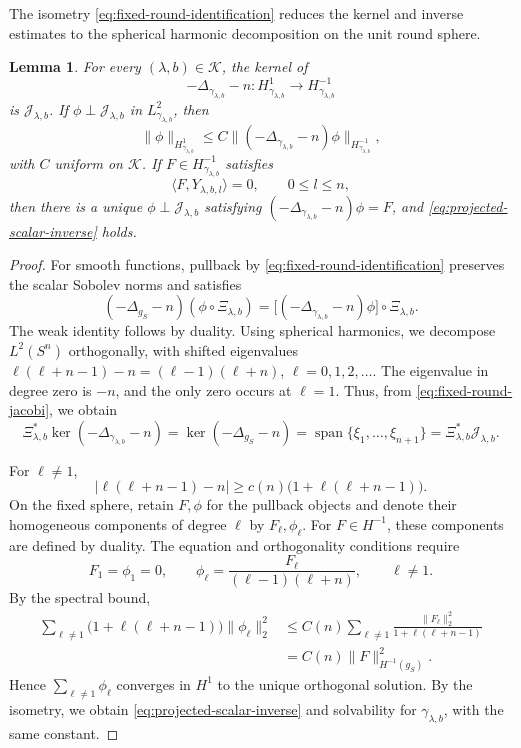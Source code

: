 \documentclass[11pt]{article}
\numberwithin{equation}{section}
\newtheorem{lemma}[theorem]{Lemma}
\theoremstyle{remark}
\newcommand{\Sph}{S}
\newcommand{\norm}[1]{\lVert #1\rVert}
\begin{document}
The isometry \eqref{eq:fixed-round-identification} reduces the kernel
and inverse estimates to the spherical harmonic decomposition on the
unit round sphere.

\begin{lemma}\label{lem:euclidean-scalar-fredholm}
For every \((\lambda,b)\in\mathcal K\), the kernel of
\[
 -\Delta_{\gamma_{\lambda,b}}-n:
 H^1_{\gamma_{\lambda,b}}\to
 H^{-1}_{\gamma_{\lambda,b}}
\]
is \(\mathcal J_{\lambda,b}\).  If
\(\phi\perp\mathcal J_{\lambda,b}\) in \(L^2_{\gamma_{\lambda,b}}\), then
\begin{equation}\label{eq:projected-scalar-inverse}
 \norm{\phi}_{H^1_{\gamma_{\lambda,b}}}
 \le C\norm{(-\Delta_{\gamma_{\lambda,b}}-n)\phi}
 _{H^{-1}_{\gamma_{\lambda,b}}},
\end{equation}
with \(C\) uniform on \(\mathcal K\). If
\(F\in H^{-1}_{\gamma_{\lambda,b}}\) satisfies
\[
 \langle F,Y_{\lambda,b,l}\rangle=0,
 \qquad 0\le l\le n,
\]
then there is a unique
\(\phi\perp\mathcal J_{\lambda,b}\) satisfying
\((-\Delta_{\gamma_{\lambda,b}}-n)\phi=F\), and
\eqref{eq:projected-scalar-inverse} holds.
\end{lemma}

\begin{proof}
{For smooth functions, pullback by
\eqref{eq:fixed-round-identification} preserves the scalar Sobolev norms and
satisfies}
\[
 (-\Delta_{g_{S}}-n)(\phi\circ\Xi_{\lambda,b})
 =\bigl[(-\Delta_{\gamma_{\lambda,b}}-n)\phi\bigr]
   \circ\Xi_{\lambda,b}.
\]
The weak identity follows by duality.
Using spherical harmonics, we decompose
\(L^2(\Sph^n)\) orthogonally, with shifted eigenvalues \(\ell(\ell+n-1)-n=(\ell-1)(\ell+n)\), \(\ell=0,1,2,\ldots\).
The eigenvalue in degree zero is \(-n\), and the only zero occurs at
\(\ell=1\). {Thus, from \eqref{eq:fixed-round-jacobi}, we obtain}
 {
\[
 \Xi_{\lambda,b}^*\ker(-\Delta_{\gamma_{\lambda,b}}-n)
 =\ker(-\Delta_{g_{S}}-n)
 =\operatorname{span}\{\xi_1,\ldots,\xi_{n+1}\}
 =\Xi_{\lambda,b}^*\mathcal J_{\lambda,b}.
\]
}

For \(\ell\ne1\),
\[
 |\ell(\ell+n-1)-n|
 \ge c(n)\bigl(1+\ell(\ell+n-1)\bigr).
\]
On the fixed sphere, retain \(F,\phi\) for the pullback objects and
denote their homogeneous components of degree \(\ell\) by
\(F_\ell,\phi_\ell\).
For \(F\in H^{-1}\), these components are defined by duality.
The equation and orthogonality conditions require
\[
 F_1=\phi_1=0,\qquad
 \phi_\ell=\frac{F_\ell}{(\ell-1)(\ell+n)},\qquad \ell\ne1.
\]
{By the spectral bound,}
\[
 \begin{aligned}
 \sum_{\ell\ne1}\bigl(1+\ell(\ell+n-1)\bigr)\|\phi_\ell\|_2^2
 &\le C(n)\sum_{\ell\ne1}
 \frac{\|F_\ell\|_2^2}{1+\ell(\ell+n-1)}\\
 &=C(n)\|F\|_{H^{-1}(g_{S})}^2.
 \end{aligned}
\]
Hence \(\sum_{\ell\ne1}\phi_\ell\) converges in \(H^1\) to the unique
orthogonal solution. {By the isometry, we obtain
\eqref{eq:projected-scalar-inverse} and solvability for}
\(\gamma_{\lambda,b}\), with the same constant.
\end{proof}
\end{document}
